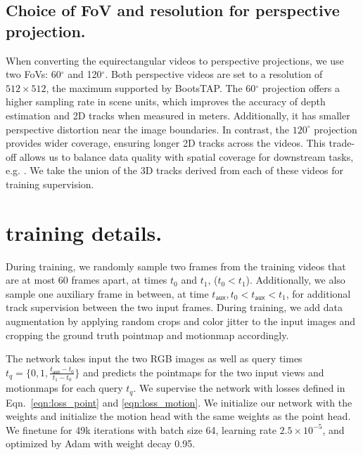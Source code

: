 \subsection{Choice of FoV and resolution for perspective projection.}
When converting the equirectangular videos to perspective projections, we use two FoVs: 60$^\circ$ and 120$^\circ$. Both perspective videos are set to a resolution of $512\times512$, the maximum supported by BootsTAP. The 60$^\circ$ projection offers a higher sampling rate in scene units, which improves the accuracy of depth estimation and 2D tracks when measured in meters. Additionally, it has smaller perspective distortion near the image boundaries. In contrast, the $120^\circ$ projection provides wider coverage, ensuring longer 2D tracks across the videos. This trade-off allows us to balance data quality with spatial coverage for downstream tasks, e.g. \method. We take the union of the 3D tracks derived from each of these videos for \method training supervision.

\section{\method training details.}
 During training, we randomly sample two frames from the training videos that are at most 60 frames apart, at times $t_0$ and $t_1$, ($t_0 < t_1$). 
Additionally, we also sample one auxiliary frame in between, at time $t_{\mathsf{aux}}, t_0<t_\mathsf{aux}<t_1$, for additional track supervision between the two input frames. During training, we add data augmentation by applying random crops and color jitter to the input images and cropping the ground truth pointmap and motionmap accordingly. 

 The network takes input the two RGB images as well as query times $t_q = \{0, 1, \frac{t_\mathsf{aux}-t_0}{t_1-t_0}\}$ and predicts the pointmaps for the two input views and motionmaps for each query $t_q$.
We supervise the network with losses defined in Eqn.~\ref{eqn:loss_point} and \ref{eqn:loss_motion}. We initialize our network with the \duster weights and initialize the motion head with the same weights as the point head. We finetune for 49k iterations with batch size 64, learning rate $2.5\times 10^{-5}$, and optimized by Adam with weight decay 0.95. 



